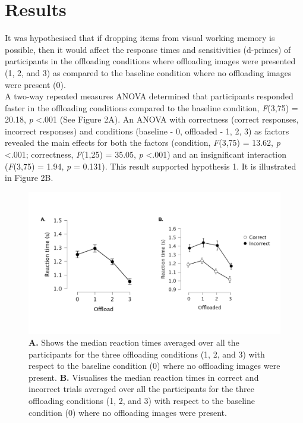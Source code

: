 \documentclass[
    a4paper,
    man,
    floatsintext,
    british
]{apa6}
\begin{document}
\section{Results}
It was hypothesised that if dropping items from visual working memory is possible, then it would affect the response times and sensitivities (d-primes) of participants in the offloading conditions where offloading images were presented (1, 2, and 3) as compared to the baseline condition where no offloading images were present (0).
\\
A two-way repeated measures ANOVA determined that participants responded faster in the offloading conditions compared to the baseline condition, \textit{F}(3,75) = 20.18, \textit{p} <.001 (See Figure 2A). An ANOVA with correctness (correct responses, incorrect responses) and conditions (baseline - 0, offloaded - 1, 2, 3) as factors revealed the main effects for both the factors (condition, \textit{F}(3,75) = 13.62, \textit{p} <.001; correctness, \textit{F}(1,25) = 35.05, \textit{p} <.001) and an insignificant interaction (\textit{F}(3,75) = 1.94, \textit{p} = 0.131). This result supported hypothesis 1. It is illustrated in Figure 2B.


\begin{figure}[hbt!]
    \centering
    \includegraphics[scale = 0.2]{medianRT.jpeg}
    \caption{\textbf{A.} Shows the median reaction times averaged over all the participants for the three offloading conditions (1, 2, and 3) with respect to the baseline condition (0) where no offloading images were present. \textbf{B.} Visualises the median reaction times in correct and incorrect trials averaged over all the participants for the three offloading conditions (1, 2, and 3) with respect to the baseline condition (0) where no offloading images were present.}
    \label{fig:medianRT}
\end{figure}
\end{document}
